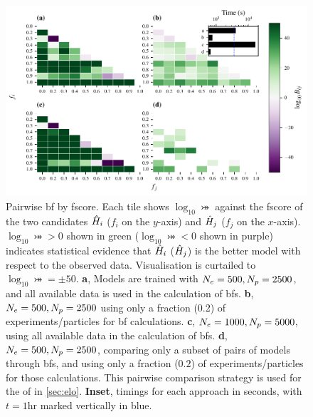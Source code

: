 \begin{figure}
    \includegraphics{theoretical_study/figures/bayes_factors_by_f_scores.pdf}
    \caption[Bayes factors by \gls{fscore}]{
        Pairwise \acrlong{bf} by \gls{fscore}. 
        Each tile shows $\log_{10}\bij$ against the \gls{fscore} of the two candidates $\hat{H}_i$ ($f_i$ on the $y$-axis) 
        and $\hat{H}_j$ ($f_j$ on the $x$-axis).
        $\log_{10}\bij > 0 $ shown in green ($\log_{10}\bij < 0 $ shown in purple) 
            indicates statistical evidence that $\hat{H}_i$ ($\hat{H}_j$) 
            is the better model with respect to the observed data.
        Visualisation is curtailed to $\log_{10} \bij = \pm 50$. 
        \textbf{a}, Models are trained with $N_e=500, N_p=2500$,
            and all available data is used in the calculation of \glspl{bf}. 
        \textbf{b}, $N_e=500, N_p=2500$ using only a fraction (0.2) of \glspl{experiment}/\glspl{particle} for \gls{bf} calculations. 
        \textbf{c}, $N_e=1000, N_p=5000$, using all available data in the calculation of \glspl{bf}. 
        \textbf{d}, $N_e=500, N_p=2500$, comparing only a subset of pairs of models through \glspl{bf}, 
            and using only a fraction ($0.2$) of \glspl{experiment}/\glspl{particle} for those calculations. 
            This pairwise comparison strategy is used for the \gls{of} in \cref{sec:elo}. 
        \textbf{Inset}, timings for each approach in seconds, with $t=1\textrm{hr}$ marked vertically in blue. 
        \figtableref
    }
    \label{fig:bf_by_fscore}
\end{figure}


